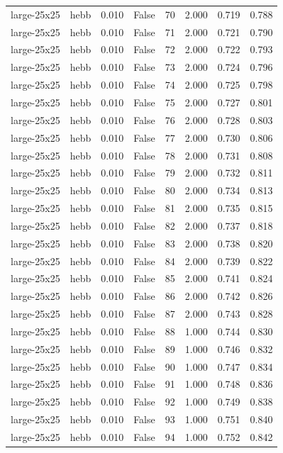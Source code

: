 \begin{tabular}{llrrrrrr}
large-25x25 & hebb & 0.010 & False & 70 & 2.000 & 0.719 & 0.788 \\
large-25x25 & hebb & 0.010 & False & 71 & 2.000 & 0.721 & 0.790 \\
large-25x25 & hebb & 0.010 & False & 72 & 2.000 & 0.722 & 0.793 \\
large-25x25 & hebb & 0.010 & False & 73 & 2.000 & 0.724 & 0.796 \\
large-25x25 & hebb & 0.010 & False & 74 & 2.000 & 0.725 & 0.798 \\
large-25x25 & hebb & 0.010 & False & 75 & 2.000 & 0.727 & 0.801 \\
large-25x25 & hebb & 0.010 & False & 76 & 2.000 & 0.728 & 0.803 \\
large-25x25 & hebb & 0.010 & False & 77 & 2.000 & 0.730 & 0.806 \\
large-25x25 & hebb & 0.010 & False & 78 & 2.000 & 0.731 & 0.808 \\
large-25x25 & hebb & 0.010 & False & 79 & 2.000 & 0.732 & 0.811 \\
large-25x25 & hebb & 0.010 & False & 80 & 2.000 & 0.734 & 0.813 \\
large-25x25 & hebb & 0.010 & False & 81 & 2.000 & 0.735 & 0.815 \\
large-25x25 & hebb & 0.010 & False & 82 & 2.000 & 0.737 & 0.818 \\
large-25x25 & hebb & 0.010 & False & 83 & 2.000 & 0.738 & 0.820 \\
large-25x25 & hebb & 0.010 & False & 84 & 2.000 & 0.739 & 0.822 \\
large-25x25 & hebb & 0.010 & False & 85 & 2.000 & 0.741 & 0.824 \\
large-25x25 & hebb & 0.010 & False & 86 & 2.000 & 0.742 & 0.826 \\
large-25x25 & hebb & 0.010 & False & 87 & 2.000 & 0.743 & 0.828 \\
large-25x25 & hebb & 0.010 & False & 88 & 1.000 & 0.744 & 0.830 \\
large-25x25 & hebb & 0.010 & False & 89 & 1.000 & 0.746 & 0.832 \\
large-25x25 & hebb & 0.010 & False & 90 & 1.000 & 0.747 & 0.834 \\
large-25x25 & hebb & 0.010 & False & 91 & 1.000 & 0.748 & 0.836 \\
large-25x25 & hebb & 0.010 & False & 92 & 1.000 & 0.749 & 0.838 \\
large-25x25 & hebb & 0.010 & False & 93 & 1.000 & 0.751 & 0.840 \\
large-25x25 & hebb & 0.010 & False & 94 & 1.000 & 0.752 & 0.842 \\

\end{tabular}
